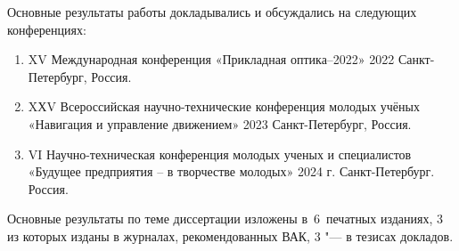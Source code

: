 {\probation}
Основные результаты работы докладывались и обсуждались на следующих конференциях:
\begin{enumerate}
	\item XV Международная конференция «Прикладная оптика–2022» 2022 Санкт-Петербург, Россия.
	\item XХV Всероссийская научно-технические конференция молодых учёных «Навигация и управление движением» 2023 Санкт-Петербург, Россия.
	\item VI Научно-техническая конференция молодых ученых и специалистов «Будущее предприятия – в творчестве молодых» 2024 г. Санкт-Петербург. Россия.
\end{enumerate}

{\publications} Основные результаты по теме диссертации изложены
в~6~печатных изданиях,
3 из которых изданы в журналах, рекомендованных ВАК,
3 "--- в тезисах докладов.

